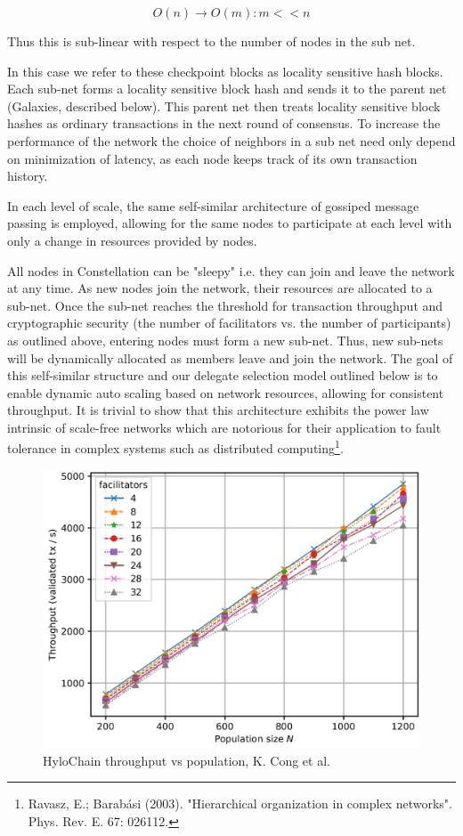 \documentclass{article}
\begin{document}
\begin{equation}
O(n) \rightarrow O(m) : m<<n
\end{equation}

Thus this is sub-linear with respect to the number of nodes in the sub net. 

In this case we refer to these checkpoint blocks as locality sensitive hash blocks. Each sub-net forms a locality sensitive block hash and sends it to the parent net (Galaxies, described below). This parent net then treats locality sensitive block hashes as ordinary transactions in the next round of consensus. To increase the performance of the network the choice of neighbors in a sub net need only depend on minimization of latency, as each node keeps track of its own transaction history.

In each level of scale, the same self-similar architecture of gossiped message passing is employed, allowing for the same nodes to participate at each level with only a change in resources provided by nodes.

All nodes in Constellation can be  "sleepy" i.e. they can join and leave the network at any time. As new nodes join the network, their resources are allocated to a sub-net. Once the sub-net reaches the threshold for transaction throughput and cryptographic security (the number of facilitators vs. the number of participants) as outlined above, entering nodes must form a new sub-net. Thus, new sub-nets will be dynamically allocated as members leave and join the network. The goal of this self-similar structure and our delegate selection model outlined below is to enable dynamic auto scaling based on network resources, allowing for consistent throughput. It is trivial to show that this architecture exhibits the power law intrinsic of scale-free networks which are notorious for their application to fault tolerance in complex systems such as distributed computing\footnote{Ravasz, E.; Barabási (2003). "Hierarchical organization in complex networks". Phys. Rev. E. 67: 026112.}. 

\begin{figure}[H]
\centering
\includegraphics[scale=0.45]{hylochain-throughput-graph}
\caption{HyloChain throughput vs population, K. Cong et al.}
\end{figure} 
\end{document}
